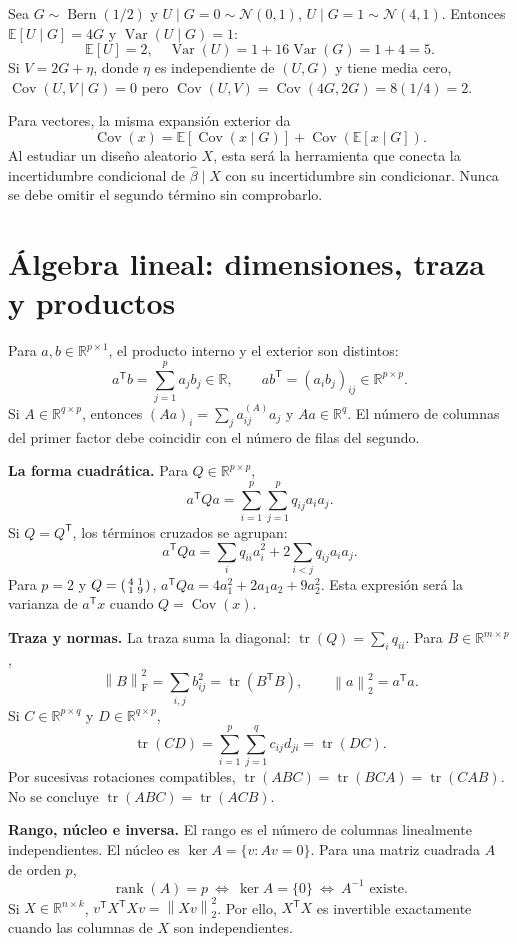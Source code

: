 \documentclass[11pt,a4paper]{article}
\newcommand{\R}{\mathbb R}
\newcommand{\E}{\mathbb E}
\newcommand{\T}{^{\mathsf T}}
\newcommand{\norm}[1]{\left\lVert #1\right\rVert}
\DeclareMathOperator{\Var}{Var}
\DeclareMathOperator{\Cov}{Cov}
\DeclareMathOperator{\tr}{tr}
\DeclareMathOperator{\rank}{rank}
\newcommand{\Normal}{\mathcal N}
\newcommand{\F}{_{\mathrm F}}
\newcommand{\topic}[2]{\clearpage\section{#1}\label{#2}}
\theoremstyle{definition}\newtheorem{definicion}[teorema]{Definición}
\begin{document}
\begin{ejemplo}
Sea $G\sim\operatorname{Bern}(1/2)$ y
$U\mid G=0\sim\Normal(0,1)$,
$U\mid G=1\sim\Normal(4,1)$.
Entonces $\E[U\mid G]=4G$ y $\Var(U\mid G)=1$:
\[
\E[U]=2,\quad \Var(U)=1+16\Var(G)=1+4=5.
\]
Si $V=2G+\eta$, donde $\eta$ es independiente de $(U,G)$ y tiene media
cero, $\Cov(U,V\mid G)=0$ pero
$\Cov(U,V)=\Cov(4G,2G)=8(1/4)=2$.
\end{ejemplo}
Para vectores, la misma expansión exterior da
\[
\Cov(x)=\E[\Cov(x\mid G)]+\Cov(\E[x\mid G]).
\]
Al estudiar un diseño aleatorio $X$, esta será la herramienta que conecta
la incertidumbre condicional de $\widehat\beta\mid X$ con su incertidumbre
sin condicionar. Nunca se debe omitir el segundo término sin comprobarlo.
\topic{Álgebra lineal: dimensiones, traza y productos}{s11}
Para $a,b\in\R^{p\times1}$, el producto interno y el exterior son distintos:
\[
a\T b=\sum_{j=1}^pa_jb_j\in\R,\qquad
ab\T=(a_ib_j)_{ij}\in\R^{p\times p}.
\]
Si $A\in\R^{q\times p}$, entonces $(Aa)_i=\sum_ja_{ij}^{(A)}a_j$ y
$Aa\in\R^q$. El número de columnas del primer factor debe coincidir con
el número de filas del segundo.

\textbf{La forma cuadrática.} Para $Q\in\R^{p\times p}$,
\[
a\T Qa=\sum_{i=1}^p\sum_{j=1}^pq_{ij}a_ia_j.
\]
Si $Q=Q\T$, los términos cruzados se agrupan:
\[
a\T Qa=\sum_iq_{ii}a_i^2+2\sum_{i<j}q_{ij}a_ia_j.
\]
Para $p=2$ y $Q=\begin{psmallmatrix}4&1\\1&9\end{psmallmatrix}$,
$a\T Qa=4a_1^2+2a_1a_2+9a_2^2$.
Esta expresión será la varianza de $a\T x$ cuando $Q=\Cov(x)$.

\textbf{Traza y normas.} La traza suma la diagonal:
$\tr(Q)=\sum_iq_{ii}$. Para $B\in\R^{m\times p}$,
\[
\norm B\F^2=\sum_{i,j}b_{ij}^2=\tr(B\T B),\qquad
\norm a_2^2=a\T a.
\]
Si $C\in\R^{p\times q}$ y $D\in\R^{q\times p}$,
\[
\tr(CD)=\sum_{i=1}^p\sum_{j=1}^qc_{ij}d_{ji}=\tr(DC).
\]
Por sucesivas rotaciones compatibles, $\tr(ABC)=\tr(BCA)=\tr(CAB)$.
No se concluye $\tr(ABC)=\tr(ACB)$.

\textbf{Rango, núcleo e inversa.} El rango es el número de columnas
linealmente independientes. El núcleo es
$\ker A=\{v:Av=0\}$. Para una matriz cuadrada $A$ de orden $p$,
\[
\rank(A)=p\ \Longleftrightarrow\ \ker A=\{0\}
\ \Longleftrightarrow\ A^{-1}\text{ existe}.
\]
Si $X\in\R^{n\times k}$,
$v\T X\T Xv=\norm{Xv}_2^2$. Por ello, $X\T X$ es invertible
exactamente cuando las columnas de $X$ son independientes.
\end{document}
